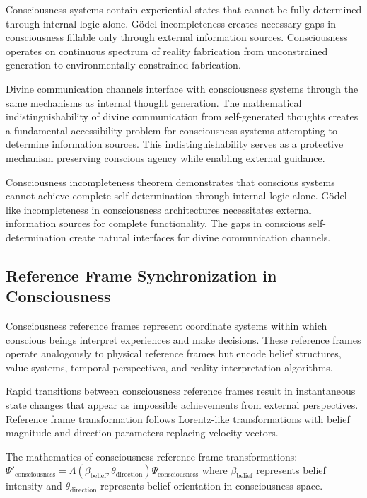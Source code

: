 \documentclass[12pt,a4paper]{article}
\begin{document}
Consciousness systems contain experiential states that cannot be fully determined through internal logic alone. Gödel incompleteness creates necessary gaps in consciousness fillable only through external information sources. Consciousness operates on continuous spectrum of reality fabrication from unconstrained generation to environmentally constrained fabrication.

Divine communication channels interface with consciousness systems through the same mechanisms as internal thought generation. The mathematical indistinguishability of divine communication from self-generated thoughts creates a fundamental accessibility problem for consciousness systems attempting to determine information sources. This indistinguishability serves as a protective mechanism preserving conscious agency while enabling external guidance.

Consciousness incompleteness theorem demonstrates that conscious systems cannot achieve complete self-determination through internal logic alone. Gödel-like incompleteness in consciousness architectures necessitates external information sources for complete functionality. The gaps in conscious self-determination create natural interfaces for divine communication channels.

\subsection{Reference Frame Synchronization in Consciousness}

Consciousness reference frames represent coordinate systems within which conscious beings interpret experiences and make decisions. These reference frames operate analogously to physical reference frames but encode belief structures, value systems, temporal perspectives, and reality interpretation algorithms.

Rapid transitions between consciousness reference frames result in instantaneous state changes that appear as impossible achievements from external perspectives. Reference frame transformation follows Lorentz-like transformations with belief magnitude and direction parameters replacing velocity vectors.

The mathematics of consciousness reference frame transformations: $\Psi'_{\text{consciousness}} = \Lambda(\beta_{\text{belief}}, \theta_{\text{direction}}) \Psi_{\text{consciousness}}$ where $\beta_{\text{belief}}$ represents belief intensity and $\theta_{\text{direction}}$ represents belief orientation in consciousness space.
\end{document}
